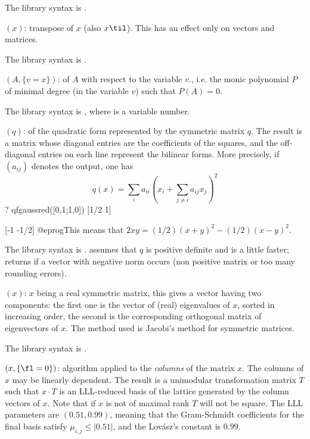 The library syntax is .

$(x)$: \label{se:mattranspose}transpose of $x$ (also $x\til$).
This has an effect only on vectors and matrices.

The library syntax is .

$(A,\{v=x\})$: \label{se:minpoly}
of $A$ with respect to the variable $v$., i.e. the monic polynomial $P$
of minimal degree (in the variable $v$) such that $P(A) = 0$.

The library syntax is , where  is a variable number.

$(q)$: \label{se:qfgaussred}
 of the
quadratic form represented by the symmetric matrix $q$. The result is a
matrix whose diagonal entries are the coefficients of the squares, and the
off-diagonal entries on each line represent the bilinear forms. More
precisely, if $(a_{ij})$ denotes the output, one has
$$ q(x) = \sum_i a_{ii} (x_i + \sum_{j \neq i} a_{ij} x_j)^2 $$
\bprog
? qfgaussred([0,1;1,0])
[1/2 1]

[-1 -1/2]
@eprog\noindent This means that $2xy = (1/2)(x+y)^2 - (1/2)(x-y)^2$.

The library syntax is .
 assumes that $q$ is
 positive definite and is a little faster; returns  if a vector
 with negative norm occurs (non positive matrix or too many rounding errors).

$(x)$: \label{se:qfjacobi}$x$ being a real symmetric matrix, this gives a
vector having two components: the first one is the vector of (real)
eigenvalues of $x$, sorted in increasing order, the second is the
corresponding orthogonal matrix of eigenvectors of $x$. The method used is
Jacobi's method for symmetric matrices.

The library syntax is .

$(x,\{\fl=0\})$: \label{se:qflll} algorithm applied to the
\emph{columns} of the matrix $x$. The columns of $x$ may be linearly
dependent. The result is a unimodular transformation matrix $T$ such that $x
\cdot T$ is an LLL-reduced basis of the lattice generated by the column
vectors of $x$. Note that if $x$ is not of maximal rank $T$ will not be
square. The LLL parameters are $(0.51,0.99)$, meaning that the Gram-Schmidt
coefficients for the final basis satisfy $\mu_{i,j} \leq |0.51|$, and the
Lov\'{a}sz's constant is $0.99$.

